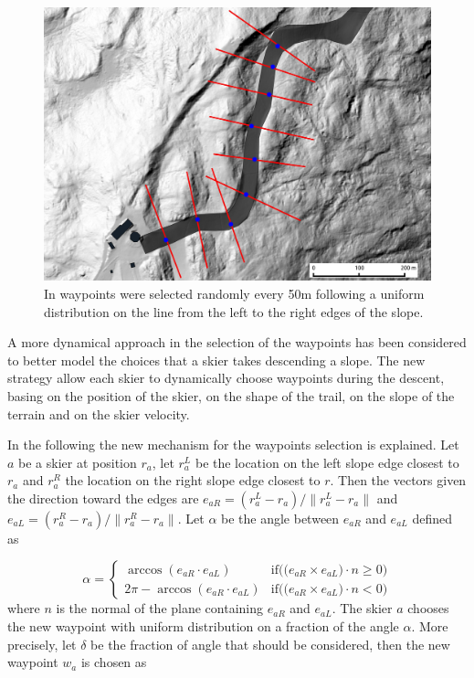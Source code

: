 \documentclass[12pt,a4paper,twoside]{book}
\newcommand{\norm}[1]{\lVert#1\rVert}
\begin{document}
\begin{figure}[!ht]
  \begin{center}
    \includegraphics[width=\textwidth]{images/waypoint_line.eps}
    \caption{In \cite{hol2012} waypoints were selected randomly every 50m following a uniform distribution on the line from the left to the right edges of the slope.}\label{waypoints_old_pic}
  \end{center}
\end{figure}

A more dynamical approach in the selection of the waypoints has been considered to better model the choices that a skier takes descending a slope. The new strategy allow each skier to dynamically choose waypoints during the descent, basing on the position of the skier, on the shape of the trail, on the slope of the terrain and on the skier velocity.

In the following the new mechanism for the waypoints selection is explained. Let $a$ be a skier at position $r_a$, let $r_a^L$ be the location on the left slope edge closest to $r_a$ and $r_a^R$ the location on the right slope edge closest to $r$. Then the vectors given the direction toward the edges are $e_{aR}=\left(r_a^L-r_a\right)/\norm{r_a^L-r_a}$ and $e_{aL}=\left(r_a^R-r_a\right)/\norm{r_a^R-r_a}$. Let $\alpha$ be the angle between $e_{aR}$ and $e_{aL}$ defined as

\begin{equation}
\alpha=\begin{cases}
  \arccos(e_{aR} \cdot e_{aL}) & \text{if(($e_{aR} \times e_{aL})\cdot n \ge 0$)} \\
  2\pi-\arccos(e_{aR} \cdot e_{aL}) & \text{if(($e_{aR} \times e_{aL})\cdot n < 0$)}
\end{cases}
\end{equation}
where $n$ is the normal of the plane containing $e_{aR}$ and $e_{aL}$. The skier $a$ chooses the new waypoint with uniform distribution on a fraction of the angle $\alpha$. More precisely, let $\delta$ be the fraction of angle that should be considered, then the new waypoint $w_a$ is chosen as
\end{document}
